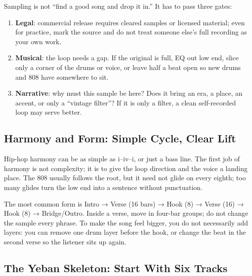 Sampling is not ``find a good song and drop it in.'' It has to pass three gates:

\begin{enumerate}
\item \textbf{Legal}: commercial release requires cleared samples or licensed material; even for practice, mark the source and do not treat someone else's full recording as your own work.
\item \textbf{Musical}: the loop needs a gap. If the original is full, EQ out low end, slice only a corner of the drums or voice, or leave half a beat open so new drums and 808 have somewhere to sit.
\item \textbf{Narrative}: why must this sample be here? Does it bring an era, a place, an accent, or only a ``vintage filter''? If it is only a filter, a clean self-recorded loop may serve better.
\end{enumerate}

\subsection{Harmony and Form: Simple Cycle, Clear Lift}
\label{sec:hiphop-harmony-form}

Hip-hop harmony can be as simple as i--iv--i, or just a bass line. The first job of harmony is not complexity; it is to give the loop direction and the voice a landing place. The 808 usually follows the root, but it need not glide on every eighth; too many glides turn the low end into a sentence without punctuation.

The most common form is Intro → Verse (16 bars) → Hook (8) → Verse (16) → Hook (8) → Bridge/Outro. Inside a verse, move in four-bar groups; do not change the sample every phrase. To make the song feel bigger, you do not necessarily add layers: you can remove one drum layer before the hook, or change the beat in the second verse so the listener sits up again.

\subsection{The Yeban Skeleton: Start With Six Tracks}
\label{sec:hiphop-yeban}

